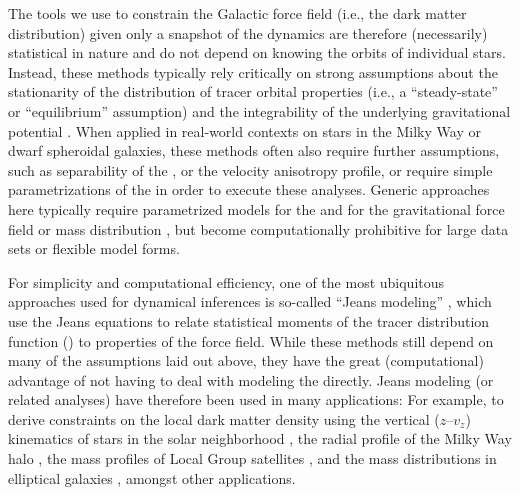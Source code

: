 \documentclass[modern]{aastex63}
\begin{document}
The tools we use to constrain the Galactic force field (i.e., the dark matter
distribution) given only a snapshot of the dynamics are therefore (necessarily)
statistical in nature and do not depend on knowing the orbits of individual
stars.
Instead, these methods typically rely critically on strong assumptions about the
stationarity of the distribution of tracer orbital properties (i.e., a
``steady-state'' or ``equilibrium'' assumption) and the integrability of the
underlying gravitational potential \citep[see, e.g.,][for a review of such
methods as applied to the problem of determining the local dark matter
density]{Read:2014}.
When applied in real-world contexts on stars in the Milky Way or dwarf
spheroidal galaxies, these methods often also require further assumptions, such
as separability of the , or the velocity anisotropy profile, or
require simple parametrizations of the  in order to execute these
analyses.
Generic approaches here typically require parametrized models for the
 and for the gravitational force field or mass distribution
\citep[e.g.,][]{McMillan:2013, Magorrian:2014, Binney:2014, Magorrian:2019}, but
become computationally prohibitive for large data sets or flexible model forms.

For simplicity and computational efficiency, one of the most ubiquitous
approaches used for dynamical inferences is so-called ``Jeans modeling''
\citep{Binney:2008}, which use the Jeans equations to relate statistical
moments of the tracer distribution function () to properties of the
force field.
While these methods still depend on many of the assumptions laid out above, they
have the great (computational) advantage of not having to deal with modeling the
 directly.
Jeans modeling (or related analyses) have therefore been used in many
applications:
For example, to derive constraints on the local dark matter density using the
vertical ($z$--$v_z$) kinematics of stars in the solar neighborhood
\citep[e.g.,][]{Jeans:1922, Oort:1932, Bahcall:1984, Buch:2019}, the radial
profile of the Milky Way halo \citep[e.g.,][]{Watkins:2010, Zhai:2018}, the mass
profiles of Local Group satellites \citep[e.g.,][]{Evans:2009, Walker:2011}, and
the mass distributions in elliptical galaxies \citep[e.g.,][]{Romanowsky:2003,
Mamon:2005, Sonnenfeld:2012}, amongst other applications.
\end{document}
